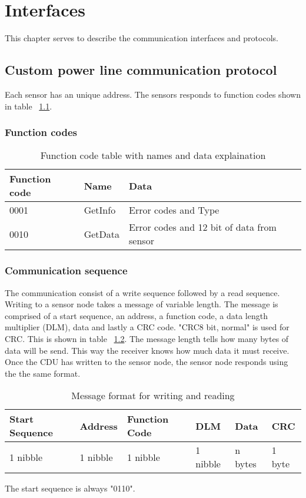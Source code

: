 \chapter{Interfaces}
This chapter serves to describe the communication interfaces and protocols. 
\section{Custom power line communication protocol}
Each sensor has an unique address. The sensors responds to function codes shown in table ~\ref{table:functioncodes}.

\subsection{Function codes}
\begin{table}[H]
\centering
\begin{tabular}{|l|l|l|}
	\hline
	Function code & Name & Data \\ 
	\hline
	0001 	& GetInfo & Error codes and Type \\
	\hline
	0010	& GetData & Error codes and 12 bit of data from sensor \\
	\hline
\end{tabular}
\caption{Function code table with names and data explaination}
\label{table:functioncodes}
\end{table}

\subsection{Communication sequence}
The communication consist of a write sequence followed by a read sequence.\\
Writing to a sensor node takes a message of variable length. The message is comprised of a start sequence, an address, a function code, a data length multiplier (DLM), data and lastly a CRC code. "CRC8 bit, normal" is used for CRC. This is shown in table ~\ref{table:stdmsgtosensor}. The message length tells how many bytes of data will be send. This way the receiver knows how much data it must receive. Once the CDU has written to the sensor node, the sensor node responds using the the same format. \\

\begin{table}[H]
\centering
\begin{tabular}{|l|l|l|l|l|l|}
	\hline
	Start Sequence & Address & Function Code & DLM & Data & CRC  \\ \hline
	1 nibble & 1 nibble	& 1 nibble & 1 nibble & n bytes & 1 byte\\
	\hline
\end{tabular}
\caption{Message format for writing and reading}
\label{table:stdmsgtosensor}
\end{table}
The start sequence is always "0110".\\

